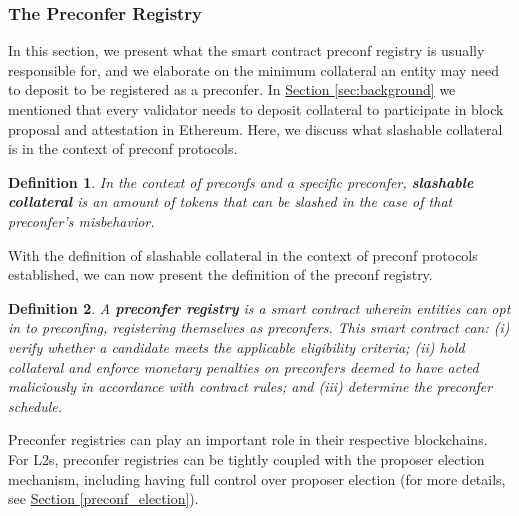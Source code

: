 \documentclass[a4paper]{article}
\theoremstyle{boldstyle}
\newtheorem{definitionx}{Definition}
\newenvironment{definition}
  {\begin{defopenboxq}\begin{definitionx}}
  {\end{definitionx}\end{defopenboxq}}
\begin{document}
        \subsubsection{The Preconfer Registry} \label{preconfer_registry}
        In this section, we present what the smart contract preconf registry is usually responsible for, and we elaborate on the minimum collateral an entity may need to deposit to be registered as a preconfer.
        In \hyperref[sec:background]{Section \ref{sec:background}} we mentioned that every validator needs to deposit collateral to participate in block proposal and attestation in Ethereum. Here, we discuss what slashable collateral is in the context of preconf protocols. 
        \begin{definition}
            In the context of preconfs and a specific preconfer, \textbf{slashable collateral} is an amount of tokens that can be slashed in the case of that preconfer's misbehavior. 
        \end{definition}
        With the definition of slashable collateral in the context of preconf protocols established, we can now present the definition of the preconf registry.
        \begin{definition}
        \label{def: preconf_registry}
        A \textbf{preconfer registry} is a smart contract wherein entities can opt in to preconfing, registering themselves as preconfers. This smart contract can: (i) verify whether a candidate meets the applicable eligibility criteria; (ii) hold collateral and enforce monetary penalties on preconfers deemed to have acted maliciously in accordance with contract rules; and (iii) determine the preconfer schedule.
        \end{definition}

        
        Preconfer registries \cite{W:CrediblyNeutralPreconfirmationCollateral:ThePreconfirmationRegistry,W:UniversalRegistryContract} can play an important role in their respective blockchains. For L2s, preconfer registries can be tightly coupled with the proposer election mechanism, including having full control over proposer election (for more details, see \hyperref[preconf_election]{Section \ref{preconf_election}}).
 
\end{document}
